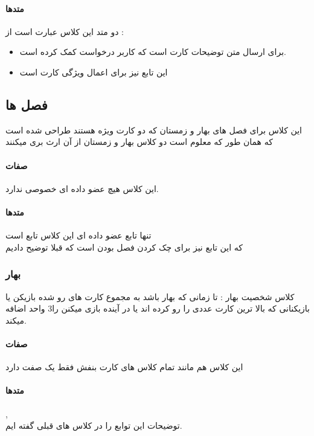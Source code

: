 \documentclass[pdf,titlepage,a4paper]{report}
\begin{document}
	\paragraph{متدها}

	 دو متد این کلاس عبارت است از : \\
	
	\begin{itemize}
		\item {}  برای ارسال متن توضیحات کارت است که کاربر درخواست کمک کرده است.
		\item {} این تابع نیز برای اعمال ویژگی کارت است
	\end{itemize}
	

	\subsection{فصل ها}
    این کلاس برای فصل های بهار و زمستان که دو کارت ویژه هستند طراحی شده است که همان طور که معلوم است دو کلاس بهار و زمستان از آن ارث بری میکنند

	\paragraph{صفات}
	این کلاس هیچ عضو داده ای خصوصی ندارد.
	\paragraph{متدها}
	تنها تابع عضو داده ای این کلاس تابع  است \\ 
	که این تابع نیز برای چک کردن فصل بودن است که قبلا توضیح دادیم
	
	\subsubsection{بهار}
	 کلاس شخصیت بهار : تا زمانی که بهار باشد به مجموع کارت های رو شده بازیکن یا بازیکنانی که بالا ترین کارت عددی را رو کرده اند یا  در آینده بازی میکنن را3 واحد اضافه میکند.

	\paragraph{صفات}
	این کلاس هم مانند تمام کلاس های کارت بنفش فقط یک صفت  دارد
	\paragraph{متدها}
	 ,  \\
	توضیحات این توابع را در کلاس های قبلی گفته ایم.
\end{document}
